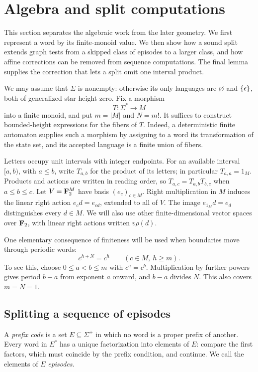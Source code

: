 \section{Algebra and split computations}\label{sec:algebra}

This section separates the algebraic work from the later geometry. We first
represent a word by its finite-monoid value. We then show how a sound split
extends graph tests from a skipped class of episodes to a larger class,
and how affine corrections can be removed from sequence computations.
The final lemma supplies the correction that lets a split omit one interval
product.

We may assume that $\Sigma$ is nonempty: otherwise its only languages
are $\varnothing$ and $\{\epsilon\}$, both of generalized star height zero.
Fix a morphism
\[
 T:\Sigma^*\longrightarrow M
\]
into a finite monoid, and put $m=|M|$ and $N=m!$.
It suffices to construct bounded-height expressions for the fibers of
$T$. Indeed, a deterministic finite automaton supplies such a morphism
by assigning to a word its transformation of the state set, and its
accepted language is a finite union of fibers.

Letters occupy unit intervals with integer endpoints. For an available
interval $[a,b)$, with $a\le b$, write $T_{a,b}$ for the product of its
letters; in particular $T_{a,a}=1_M$. Products and actions are written
in reading order, so $T_{a,c}=T_{a,b}T_{b,c}$ when $a\le b\le c$.
Let $V=\mathbf F_2^M$ have basis $(e_c)_{c\in M}$. Right multiplication in $M$ induces the
linear right action $e_c d=e_{cd}$, extended to all of $V$.
The image $e_{1_M}d=e_d$ distinguishes every $d\in M$.
We will also use other finite-dimensional vector spaces over $\mathbf F_2$,
with linear right actions written $v\rho(d)$.

One elementary consequence of finiteness will be used when boundaries
move through periodic words:
\begin{equation}\label{eq:monoid-periodicity}
 c^{h+N}=c^h\qquad(c\in M,\ h\ge m).
\end{equation}
To see this, choose $0\le a<b\le m$ with $c^a=c^b$.
Multiplication by further powers gives period $b-a$ from exponent $a$
onward, and $b-a$ divides $N$. This also covers $m=N=1$.

\subsection{Splitting a sequence of episodes}

A \emph{prefix code} is a set $E\subseteq\Sigma^+$ in which no word is
a proper prefix of another. Every word in $E^*$ has a unique
factorization into elements of $E$: compare the first factors, which
must coincide by the prefix condition, and continue. We call the
elements of $E$ \emph{episodes}.

